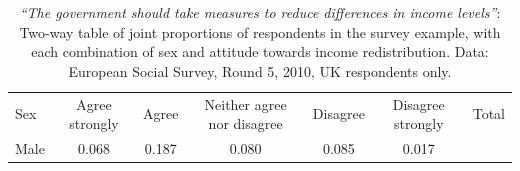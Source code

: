 \documentclass[11pt,a4paper,openany]{book}
\begin{document}
\begin{longtable}[]{@{}lcccccc@{}}
\caption{\label{tab:t-sex-attitude-pr} \emph{``The government should take
measures to reduce differences in income levels''}: Two-way table of
joint proportions of respondents in the survey example, with each
combination of sex and attitude towards income redistribution. Data:
European Social Survey, Round 5, 2010, UK respondents
only.}\tabularnewline
\toprule
\begin{minipage}[t]{0.14\columnwidth}\raggedright\strut
Sex\strut
\end{minipage} & \begin{minipage}[t]{0.15\columnwidth}\centering\strut
Agree strongly\strut
\end{minipage} & \begin{minipage}[t]{0.08\columnwidth}\centering\strut
Agree\strut
\end{minipage} & \begin{minipage}[t]{0.15\columnwidth}\centering\strut
Neither agree nor disagree\strut
\end{minipage} & \begin{minipage}[t]{0.10\columnwidth}\centering\strut
Disagree\strut
\end{minipage} & \begin{minipage}[t]{0.10\columnwidth}\centering\strut
Disagree strongly\strut
\end{minipage} & \begin{minipage}[t]{0.07\columnwidth}\centering\strut
Total\strut
\end{minipage}\tabularnewline
\begin{minipage}[t]{0.14\columnwidth}\raggedright\strut
Male\strut
\end{minipage} & \begin{minipage}[t]{0.15\columnwidth}\centering\strut
0.068\strut
\end{minipage} & \begin{minipage}[t]{0.08\columnwidth}\centering\strut
0.187\strut
\end{minipage} & \begin{minipage}[t]{0.15\columnwidth}\centering\strut
0.080\strut
\end{minipage} & \begin{minipage}[t]{0.10\columnwidth}\centering\strut
0.085\strut
\end{minipage} & \begin{minipage}[t]{0.10\columnwidth}\centering\strut
0.017\strut
\end{minipage} & \begin{minipage}[t]{0.07\columnwidth}\centering\strut

\end{minipage}
\end{longtable}
\end{document}
